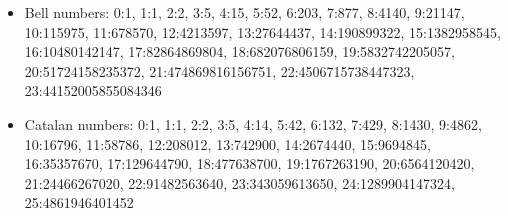 \begin{itemize}
\item
Bell numbers:
0:1, 1:1, 2:2, 3:5, 4:15, 5:52, 6:203, 7:877, 8:4140, 9:21147,
10:115975, 11:678570, 12:4213597, 13:27644437, 14:190899322,
15:1382958545, 16:10480142147, 17:82864869804, 18:682076806159,
19:5832742205057, 20:51724158235372, 21:474869816156751,
22:4506715738447323, 23:44152005855084346

\item
Catalan numbers:
0:1, 1:1, 2:2, 3:5, 4:14, 5:42, 6:132, 7:429, 8:1430, 9:4862,
10:16796, 11:58786, 12:208012, 13:742900, 14:2674440,
15:9694845, 16:35357670, 17:129644790, 18:477638700,
19:1767263190, 20:6564120420, 21:24466267020, 22:91482563640,
23:343059613650, 24:1289904147324, 25:4861946401452

\end{itemize}

